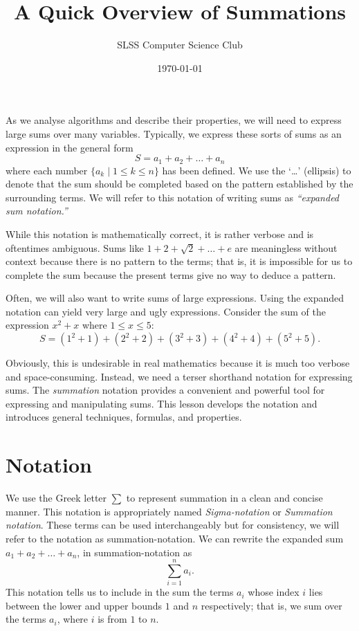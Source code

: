 \documentclass[prereq]{cslesson}
\title{A Quick Overview of Summations}
\author{SLSS Computer Science Club}
\date{\today}
\numberwithin{equation}{section}
\begin{document}
    
\maketitle

As we analyse algorithms and describe their properties, we will need to express large sums over many variables. Typically, we express these sorts of sums as an 
expression in the general form
\begin{equation*}
    S=a_1+a_2+\ldots+a_n
    \label{eq:verbose_sum}
\end{equation*}
where each number $\{a_k \mid 1 \leq k \leq n\}$ has been defined. We use the `\ldots' (ellipsis) to denote that the sum should be
completed based on the pattern established by the surrounding terms. We will refer to this notation of writing sums
as \textit{``expanded sum notation.''}
 
While this notation is mathematically correct, it is rather verbose and is oftentimes ambiguous.
Sums like $1+2+\sqrt{2}+\ldots+e$ are meaningless without context because there is no pattern to the terms; that is,
it is impossible for us to complete the sum because the present terms give no way to deduce a pattern.

Often, we will also want to write sums of large expressions. Using the expanded notation can yield very large and
ugly expressions. Consider the sum of the expression $x^2+x$ where $1 \leq x \leq 5$:
\begin{equation*}
    S=(1^2+1)+(2^2+2)+(3^2+3)+(4^2+4)+(5^2+5).
\end{equation*}

Obviously, this is undesirable in real mathematics because it is much too verbose and space-consuming.
Instead, we need a terser shorthand notation for expressing sums. The \textit{summation} notation provides a convenient and powerful tool for 
expressing and manipulating sums. This lesson develops the notation and introduces general techniques, formulas, and properties.

\section{Notation}
We use the Greek letter $\sum$ to represent summation in a clean and concise manner. This notation is appropriately named \textit{Sigma-notation} or \textit{Summation notation}. These terms can be used interchangeably but for consistency, we will refer to the notation as summation-notation. We can rewrite the expanded sum $a_1+a_2+\ldots+a_n$, in summation-notation as
\begin{equation}
    \sum^n_{i=1}a_i.
    \label{eq:first_summation}
\end{equation}
This notation tells us to include in the sum the terms $a_i$ whose index $i$ lies between the lower and upper bounds $1$ and $n$ respectively; that is, we sum over the terms $a_i$, where $i$ is from $1$ to $n$.
\end{document}
